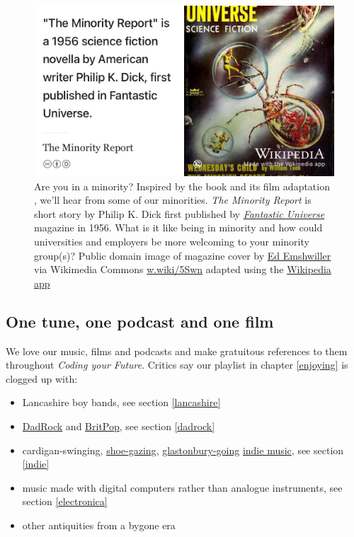 \documentclass[
]{book}
\providecommand{\tightlist}{%
  \setlength{\itemsep}{0pt}\setlength{\parskip}{0pt}}
\begin{document}
\begin{figure}

{\centering \includegraphics[width=0.99\linewidth]{images/minority-report} 

}

\caption{Are you in a minority? Inspired by the book \citep{theminorityreport} and its film adaptation \citep{minorityreport}, we'll hear from some of our minorities. \emph{The Minority Report} is short story by Philip K. Dick first published by \emph{\href{https://en.wikipedia.org/wiki/Fantastic_Universe}{Fantastic Universe}} magazine in 1956. What is it like being in minority and how could universities and employers be more welcoming to your minority group(s)? Public domain image of magazine cover by \href{https://en.wikipedia.org/wiki/Ed_Emshwiller}{Ed Emshwiller} via Wikimedia Commons \href{https://w.wiki/5Swn}{w.wiki/5Swn} adapted using the \href{https://apps.apple.com/us/app/wikipedia/id324715238}{Wikipedia app}}\label{fig:minority-fig}
\end{figure}



\hypertarget{otopof}{%
\subsection{One tune, one podcast and one film}\label{otopof}}

We love our music, films and podcasts and make gratuitous references to them throughout \emph{Coding your Future}. Critics say our playlist in chapter \ref{enjoying} is clogged up with:

\begin{itemize}
\tightlist
\item
  Lancashire boy bands, see section \ref{lancashire}
\item
  \href{https://www.amazon.co.uk/Dad-Rock/dp/B09F6GQSKK}{DadRock} and \href{https://en.wikipedia.org/wiki/Britpop}{BritPop}, see section \ref{dadrock}
\item
  cardigan-swinging, \href{https://en.wikipedia.org/wiki/Shoegaze}{shoe-gazing}, \href{https://en.wikipedia.org/wiki/Glastonbury_Festival}{glastonbury-going} \href{https://en.wikipedia.org/wiki/Indie_rock}{indie music}, see section \ref{indie}
\item
  music made with digital computers rather than analogue instruments, see section \ref{electronica}
\item
  other antiquities from a bygone era \citep{dadrock2}
\end{itemize}
\end{document}
